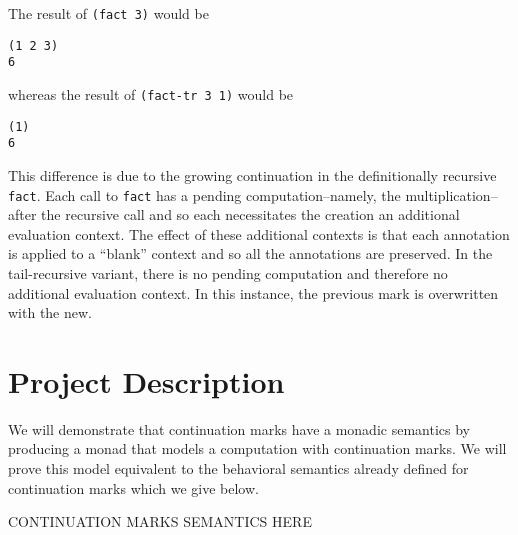 \documentclass[ms]{byuprop}
\newcounter{definition}
\begin{document}
The result of \texttt{(fact 3)} would be

\begin{verbatim}
(1 2 3)
6
\end{verbatim}

whereas the result of \texttt{(fact-tr 3 1)} would be

\begin{verbatim}
(1)
6
\end{verbatim}

This difference is due to the growing continuation in the definitionally recursive
\texttt{fact}. Each call to \texttt{fact} has a pending computation--namely, the
multiplication--after the recursive call and so each necessitates the creation an
additional evaluation context. The effect of these additional contexts is that each
annotation is applied to a ``blank'' context and so all the annotations are preserved. In
the tail-recursive variant, there is no pending computation and therefore no additional
evaluation context. In this instance, the previous mark is overwritten with the new.




\section{Project Description}

We will demonstrate that continuation marks have a monadic semantics by producing a monad
that models a computation with continuation marks. We will prove  this model equivalent to
the behavioral semantics already defined for continuation marks which we give below.

CONTINUATION MARKS SEMANTICS HERE


\end{document}
